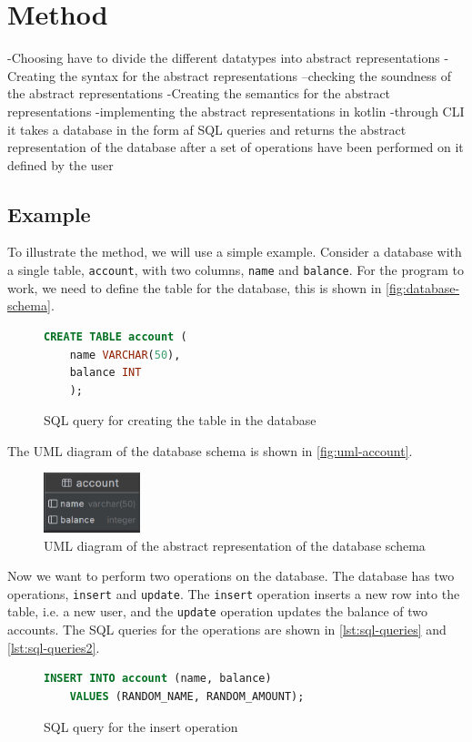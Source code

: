 \section{Method}
\label{sec:method}
-Choosing have to divide the different datatypes into abstract representations
-Creating the syntax for the abstract representations
--checking the soundness of the abstract representations
-Creating the semantics for the abstract representations
-implementing the abstract representations in kotlin
-through CLI it takes a database in the form af SQL queries and returns the abstract representation of the database after a set of operations have been performed on it defined by the user


\subsection{Example}\label{subsec:example}
To illustrate the method, we will use a simple example.
Consider a database with a single table, \texttt{account}, with two columns, \texttt{name} and \texttt{balance}.
For the program to work, we need to define the table for the database, this is shown in \autoref{fig:database-schema}.

\begin{figure}[htb!]
\begin{lstlisting}[language=SQL]
    CREATE TABLE account (
    name VARCHAR(50),
    balance INT
    );
\end{lstlisting}
\caption{SQL query for creating the table in the database}
\label{fig:database-schema}
\end{figure}

The UML diagram of the database schema is shown in \autoref{fig:uml-account}.

\begin{figure}[htb!]
    \centering
    \includegraphics[width=0.25\textwidth]{figures/account.png}
    \caption{UML diagram of the abstract representation of the database schema}
    \label{fig:uml-account}
\end{figure}

Now we want to perform two operations on the database.
The database has two operations, \texttt{insert} and \texttt{update}.
The \texttt{insert} operation inserts a new row into the table, i.e. a new user, and the \texttt{update} operation updates the balance of two accounts.
The SQL queries for the operations are shown in \autoref{lst:sql-queries} and \autoref{lst:sql-queries2}.
\begin{figure}
\begin{lstlisting}[language=SQL]
    INSERT INTO account (name, balance)
    VALUES (RANDOM_NAME, RANDOM_AMOUNT);
\end{lstlisting}
\label{lst:sql-queries}
\caption{SQL query for the insert operation}
\end{figure}

